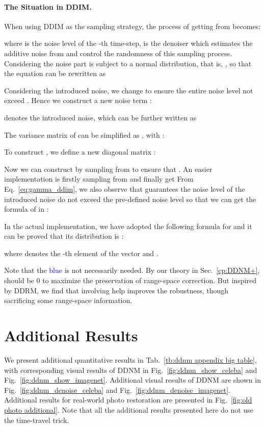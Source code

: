 \documentclass{article} \usepackage{iclr2023_conference,times}
\begin{document}
\paragraph{The Situation in DDIM.}
When using DDIM as the sampling strategy, the process of getting  from  becomes:

where  is the noise level of the -th time-step,  is the denoiser which estimates the additive noise from  and  control the randomness of this sampling process.
Considering the noise part is subject to a normal distribution, that is, , so that the equation can be rewritten as 

Considering the introduced noise, we change  to ensure the entire noise level not exceed . Hence we construct a new noise term :

 denotes the introduced noise, which can be further written as

The variance matrix of  can be simplified as , with : 

To construct , we define a new diagonal matrix :

Now we can construct  by sampling from  to ensure that . An easier implementation is firstly sampling  from  and finally get  From Eq.~\ref{eq:gamma_ddim}, we also observe that  guarantees the noise level of the introduced noise do not exceed the pre-defined noise level  so that we can get the formula of  in :

In the actual implementation, we have adopted the following formula for  and it can be proved that its distribution is :

where  denotes the -th element of the vector  and .

Note that the \textcolor{blue}{blue}  is not necessarily needed. By our theory in Sec.~\ref{cp:DDNM+},  should be 0 to maximize the preservation of range-space correction. But inspired by DDRM\citep{kawar2022denoising}, we find that involving  help improves the robustness, though sacrificing some range-space information.   


\newpage
\section{Additional Results}
\label{extensive exp ndm}
We present additional quantitative results in Tab.~\ref{tb:ddnm appendix big table}, with corresponding visual results of DDNM in Fig.~\ref{fig:ddnm_show_celeba} and Fig.~\ref{fig:ddnm_show_imagenet}. Additional visual results of DDNM are shown in Fig.~\ref{fig:ddnm_denoise_celeba} and Fig.~\ref{fig:ddnm_denoise_imagenet}. Additional results for real-world photo restoration are presented in Fig.~\ref{fig:old photo additional}. Note that all the additional results presented here do not use the time-travel trick.
\end{document}
